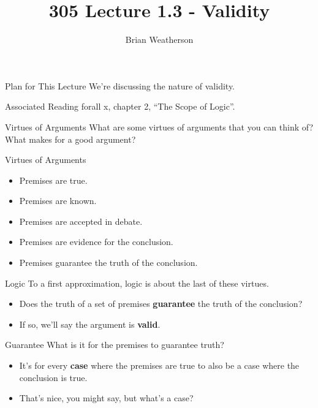 \documentclass[
  ignorenonframetext,
]{beamer}
\title{305 Lecture 1.3 - Validity}
\author{Brian Weatherson}
\date{}
\providecommand{\tightlist}{%
  \setlength{\itemsep}{0pt}\setlength{\parskip}{0pt}}
\renewcommand{\,}{\text{, }}
\begin{document}
\frame{\titlepage}

\begin{frame}{Plan for This Lecture}
\protect\hypertarget{plan-for-this-lecture}{}
We're discussing the nature of validity.
\end{frame}

\begin{frame}{Associated Reading}
\protect\hypertarget{associated-reading}{}
forall x, chapter 2, ``The Scope of Logic''.
\end{frame}

\begin{frame}{Virtues of Arguments}
\protect\hypertarget{virtues-of-arguments}{}
What are some virtues of arguments that you can think of? What makes for
a good argument?
\end{frame}

\begin{frame}{Virtues of Arguments}
\protect\hypertarget{virtues-of-arguments-1}{}
\begin{itemize}[<+->]
\tightlist
\item
  Premises are true.
\item
  Premises are known.
\item
  Premises are accepted in debate.
\item
  Premises are evidence for the conclusion.
\item
  Premises guarantee the truth of the conclusion.
\end{itemize}
\end{frame}

\begin{frame}{Logic}
\protect\hypertarget{logic}{}
To a first approximation, logic is about the last of these virtues.

\begin{itemize}
\tightlist
\item
  Does the truth of a set of premises \textbf{guarantee} the truth of
  the conclusion? \pause
\item
  If so, we'll say the argument is \textbf{valid}.
\end{itemize}
\end{frame}

\begin{frame}{Guarantee}
\protect\hypertarget{guarantee}{}
What is it for the premises to guarantee truth?

\begin{itemize}
\tightlist
\item
  It's for every \textbf{case} where the premises are true to also be a
  case where the conclusion is true. \pause
\item
  That's nice, you might say, but what's a case?
\end{itemize}
\end{frame}
\end{document}
